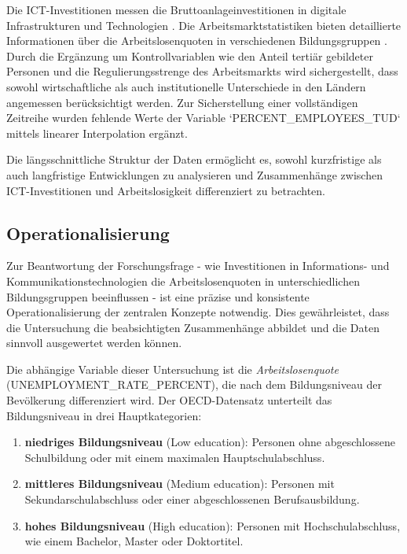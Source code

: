Die \ac{ICT}-Investitionen messen die Bruttoanlageinvestitionen in digitale Infrastrukturen 
und Technologien \parencite{oecd2022ict}. Die Arbeitsmarktstatistiken bieten detaillierte 
Informationen über die Arbeitslosenquoten in verschiedenen Bildungsgruppen 
\parencite{oecd2022unemployment}. Durch die Ergänzung um Kontrollvariablen wie den Anteil 
tertiär gebildeter Personen und die Regulierungsstrenge des Arbeitsmarkts wird sichergestellt, 
dass sowohl wirtschaftliche als auch institutionelle Unterschiede in den Ländern angemessen 
berücksichtigt werden. Zur Sicherstellung einer vollständigen Zeitreihe wurden fehlende Werte 
der Variable `PERCENT\_EMPLOYEES\_TUD` mittels linearer Interpolation ergänzt.  

Die längsschnittliche Struktur der Daten ermöglicht es, sowohl kurzfristige als auch 
langfristige Entwicklungen zu analysieren und Zusammenhänge zwischen ICT-Investitionen und 
Arbeitslosigkeit differenziert zu betrachten.



\subsection{Operationalisierung}

Zur Beantwortung der Forschungsfrage - wie Investitionen in Informations- und 
Kommunikationstechnologien die Arbeitslosenquoten in unterschiedlichen Bildungsgruppen 
beeinflussen - ist eine präzise und konsistente Operationalisierung der zentralen Konzepte 
notwendig. Dies gewährleistet, dass die Untersuchung die beabsichtigten Zusammenhänge abbildet 
und die Daten sinnvoll ausgewertet werden können.

Die abhängige Variable dieser Untersuchung ist die \textit{Arbeitslosenquote} 
(UNEMPLOYMENT\_RATE\_PERCENT), die nach dem Bildungsniveau der Bevölkerung differenziert wird. 
Der \ac{OECD}-Datensatz unterteilt das Bildungsniveau in drei Hauptkategorien:

\begin{enumerate}
    \item \textbf{niedriges Bildungsniveau} (Low education): Personen ohne abgeschlossene 
    Schulbildung oder mit einem maximalen Hauptschulabschluss.
    \item \textbf{mittleres Bildungsniveau} (Medium education): Personen mit 
    Sekundarschulabschluss oder einer abgeschlossenen Berufsausbildung.
    \item \textbf{hohes Bildungsniveau} (High education): Personen mit Hochschulabschluss, wie 
    einem Bachelor, Master oder Doktortitel.
\end{enumerate}

